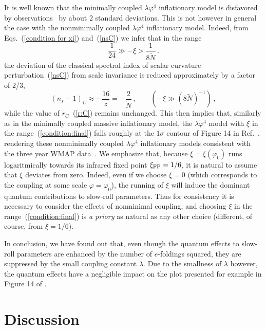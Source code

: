 \documentclass[aps,12pt,superscriptaddress,preprintnumbers,
                secnumarabic,nofootinbib,showpacs]{revtex4}
\begin{document}
 It is well known that the minimally coupled
${\lambda\varphi^4}$ inflationary model is disfavored
by observations~\cite{Spergel:2006} by about 2 standard deviations.
This is not however in general the case with the nonminimally coupled
 ${\lambda\varphi^4}$ inflationary model. Indeed,
 from Eqs.~(\ref{condition for xi}) and~(\ref{nsC})
we infer that in the range
\begin{equation}
\frac{1}{24}\gg - \xi > \frac{1}{8\tilde{N}}
\,.
\label{condition:final}
\end{equation}
the deviation of the classical spectral index of scalar curvature
perturbation~(\ref{nsC}) from scale invariance
is reduced approximately by a factor of 2/3,
\begin{equation}
(n_s-1)_{C} \approx -\frac{16}{z} = - \frac{2}{\tilde N}
\,,\qquad
  (-\xi \gg (8\tilde{N})^{-1})
\,,
\label{nsC:2}
\end{equation}
while the value of $r_C$~(\ref{r:C}) remains unchanged. This then
implies that, similarly as in the minimally coupled massive
inflationary model, the $\lambda\varphi^4$ model with $\xi$ in the
range~(\ref{condition:final}) falls roughly at the $1\sigma$
contour of Figure 14 in Ref.~\cite{Spergel:2006}, rendering these
nonminimally coupled $\lambda\varphi^4$ inflationary models
consistent with the three year WMAP
data~\cite{Spergel:2006,Tsujikawa:2004my,KomatsuFutamase:1999,FakirUnruh:1990}.
We emphasize that, because $\xi=\xi(\varphi_0)$ runs logaritmically
towards its infrared fixed point $\xi_{\rm FP} = 1/6$, it is
natural to assume that $\xi$ deviates from zero. Indeed, even if
we choose $\xi=0$ (which corresponds to the coupling at some scale
$\varphi=\varphi_0$), the running of $\xi$ will induce the
dominant quantum contributions to slow-roll parameters. Thus for
consistency it is necessary to consider the effects of nonminimal
coupling, and choosing $\xi$ in the range~(\ref{condition:final})
is {\it a priory}
 as natural as any other choice (different, of course, from $\xi=1/6$).

In conclusion, we have found out that, even though the quantum
effects to slow-roll parameters are enhanced by the number of
$e$-foldings squared, they are suppressed by the small coupling
constant $\lambda$. Due to the smallness of $\lambda$ however, the
quantum effects have a negligible impact on the plot presented for
example in Figure 14 of \cite{Spergel:2006}.

\section{Discussion}
\label{Discussion}
\end{document}

